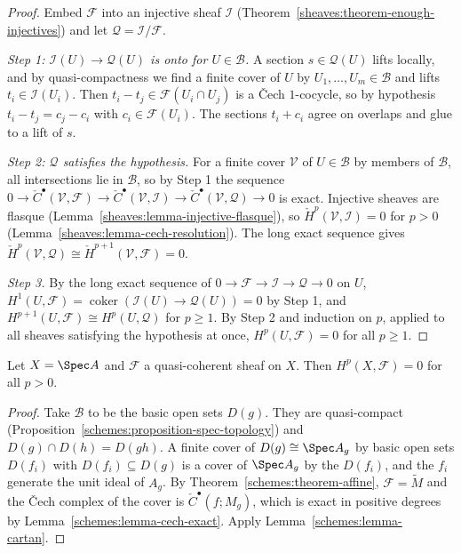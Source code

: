 \begin{proof}
Embed $\mathcal{F}$ into an injective sheaf $\mathcal{I}$ (Theorem~\ref{sheaves:theorem-enough-injectives}) and let $\mathcal{Q} = \mathcal{I}/\mathcal{F}$.

\emph{Step 1: $\mathcal{I}(U) \to \mathcal{Q}(U)$ is onto for $U \in \mathcal{B}$.} A section $s \in \mathcal{Q}(U)$ lifts locally, and by quasi-compactness we find a
finite cover of $U$ by $U_1, \ldots, U_m \in \mathcal{B}$ and lifts $t_i \in \mathcal{I}(U_i)$. Then $t_i - t_j \in \mathcal{F}(U_i \cap U_j)$ is a \v{C}ech $1$-cocycle, so by
hypothesis $t_i - t_j = c_j - c_i$ with $c_i \in \mathcal{F}(U_i)$. The sections $t_i + c_i$ agree on overlaps and glue to a lift of $s$.

\emph{Step 2: $\mathcal{Q}$ satisfies the hypothesis.} For a finite cover $\mathcal{V}$ of $U \in \mathcal{B}$ by members of $\mathcal{B}$, all intersections lie in
$\mathcal{B}$, so by Step 1 the sequence $0 \to \check C^\bullet(\mathcal{V}, \mathcal{F}) \to \check C^\bullet(\mathcal{V}, \mathcal{I}) \to \check C^\bullet(\mathcal{V}, \mathcal{Q}) \to 0$
is exact. Injective sheaves are flasque (Lemma~\ref{sheaves:lemma-injective-flasque}), so $\check H^p(\mathcal{V}, \mathcal{I}) = 0$ for $p > 0$
(Lemma~\ref{sheaves:lemma-cech-resolution}). The long exact sequence gives $\check H^p(\mathcal{V}, \mathcal{Q}) \cong \check H^{p+1}(\mathcal{V}, \mathcal{F}) = 0$.

\emph{Step 3.} By the long exact sequence of $0 \to \mathcal{F} \to \mathcal{I} \to \mathcal{Q} \to 0$ on $U$, $H^1(U, \mathcal{F}) = \operatorname{coker}(\mathcal{I}(U) \to \mathcal{Q}(U)) = 0$
by Step 1, and $H^{p+1}(U, \mathcal{F}) \cong H^p(U, \mathcal{Q})$ for $p \geq 1$. By Step 2 and induction on $p$, applied to all sheaves satisfying the hypothesis at
once, $H^p(U, \mathcal{F}) = 0$ for all $p \geq 1$.
\end{proof}

\begin{theorem}[Serre]\label{schemes:theorem-affine-vanishing}
Let $X = \Spec A$ and $\mathcal{F}$ a quasi-coherent sheaf on $X$. Then $H^p(X, \mathcal{F}) = 0$ for all $p > 0$.
\end{theorem}

\begin{proof}
Take $\mathcal{B}$ to be the basic open sets $D(g)$. They are quasi-compact (Proposition~\ref{schemes:proposition-spec-topology}) and
$D(g) \cap D(h) = D(gh)$. A finite cover of $D(g) \cong \Spec A_g$ by basic open sets $D(f_i)$ with $D(f_i) \subseteq D(g)$ is a cover of $\Spec A_g$ by the $D(f_i)$, and the
$f_i$ generate the unit ideal of $A_g$. By Theorem~\ref{schemes:theorem-affine}, $\mathcal{F} = \widetilde M$ and the \v{C}ech complex of the cover is
$\check C^\bullet(f; M_g)$, which is exact in positive degrees by Lemma~\ref{schemes:lemma-cech-exact}. Apply
Lemma~\ref{schemes:lemma-cartan}.
\end{proof}

